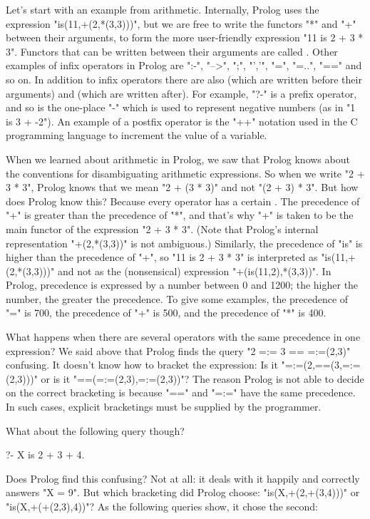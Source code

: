 Let's start with an example from arithmetic.  Internally, Prolog uses
the expression "is(11,+(2,*(3,3)))", but we are free to write the
functors "*" and "+" between their arguments, to form the more
user-friendly
expression "11 is 2 + 3 * 3".  Functors that can be written
between their arguments are called . Other
examples of infix operators in Prolog are ":-", "-->", ";", "','",
"=", "=..", "==" and so on.  In addition to infix operators there are
also  (which are written before their
arguments) and  (which are written after).
For example, "?-" is a prefix operator, and so is the one-place "-"
which is used to represent negative numbers (as in "1 is 3 + -2"). An
example of a postfix operator is the "++" notation used in the C
programming language to increment the value of a variable.

When we learned about arithmetic in Prolog, we saw that Prolog knows
about the conventions for disambiguating arithmetic expressions. So
when we write "2 + 3 * 3", Prolog knows that we mean "2 + (3 * 3)" and
not "(2 + 3) * 3". But how does Prolog know this? Because every
operator has a certain . The precedence of "+" is
greater than the precedence of "*", and that's why "+" is taken to be
the main functor of the expression "2 + 3 * 3". (Note that Prolog's
internal representation "+(2,*(3,3))" is not ambiguous.)  Similarly,
the precedence of "is" is higher than the precedence of "+", so
"11 is 2 + 3 * 3" is interpreted as "is(11,+(2,*(3,3)))" and not as the
(nonsensical) expression "+(is(11,2),*(3,3))".  In Prolog, precedence
is expressed by a number between 0 and 1200; the higher the number,
the greater the precedence.  To give some examples, the precedence of
"=" is 700, the precedence of "+" is 500, and the precedence of "*" is
400.


What happens when there are several operators with the same
precedence in one expression? We said above that Prolog finds the
query "2 =:= 3 == =:=(2,3)" confusing. It doesn't know how to
bracket the expression: Is it "=:=(2,==(3,=:=(2,3)))" or is it
"==(=:=(2,3),=:=(2,3))"? The reason Prolog is not able to decide on
the correct bracketing is because "==" and "=:=" have the same
precedence. In such cases, explicit bracketings must be supplied by
the programmer.

What about the following query though?
\begin{LPNcodedisplay}
?- X is 2 + 3 + 4.
\end{LPNcodedisplay}
Does Prolog find this  confusing? Not at all: it deals with it happily
and correctly answers "X = 9".  But which bracketing did Prolog
choose: "is(X,+(2,+(3,4)))" or "is(X,+(+(2,3),4))"?
As the following queries show, it chose the second:

